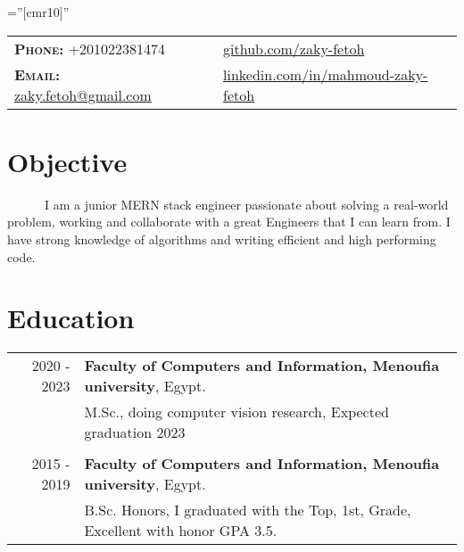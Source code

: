 \documentclass[a4paper,10pt]{article}
\begin{document}
\pagestyle{fancy}
\fancyhead{} 
\renewcommand{\headrulewidth}{0pt}

\font\fb=''[cmr10]'' 
\par{\bigskip\par} %


\begin{tabular}{lp{4cm}l}
\textbf{\textsc{Phone:}} +201022381474 && \href{https://github.com/zaky-fetoh}{github.com/zaky-fetoh} \\
\textbf{\textsc{Email:}}   \href{mailto:zaky.fetoh@gmail.com}{zaky.fetoh@gmail.com} &&\href{https://www.linkedin.com/in/mahmoud-zaky-fetoh/}{linkedin.com/in/mahmoud-zaky-fetoh}\\

\end{tabular}

\section{\textbf{Objective}}
~~~~~~I am a junior MERN stack engineer passionate about solving a real-world problem, working and collaborate with a great Engineers that I can learn from. I have strong knowledge of algorithms and writing efficient and high performing code. 

\section{\textbf{Education}}
\begin{tabular}{r|l}
    2020 - 2023  & \textbf{Faculty of Computers and Information, Menoufia university}, Egypt.\\ & M.Sc., doing computer vision research, Expected graduation  2023 \\
    &\\
    2015 - 2019 & \textbf{Faculty of Computers and Information, Menoufia university}, Egypt. \\ & B.Sc. Honors, I graduated with the Top, 1st, Grade, Excellent with honor GPA 3.5. \\
    \end{tabular}
\end{document}
